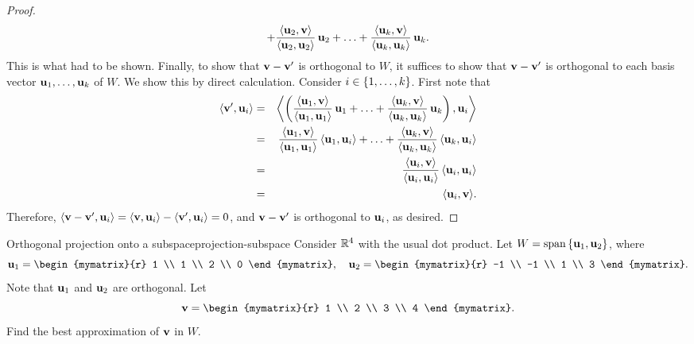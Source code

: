 \begin{proof}
\begin{equation*}
    + \frac{\iprod{\vect{u}_2,\vect{v}}}{\iprod{\vect{u}_2,\vect{u}_2}}\,\vect{u}_2
    + \ldots
    + \frac{\iprod{\vect{u}_k,\vect{v}}}{\iprod{\vect{u}_k,\vect{u}_k}}\,\vect{u}_k.
  \end{equation*}
  This is what had to be shown. Finally, to show that
  $\vect{v}-\vect{v}'$ is orthogonal to $W$, it suffices to show that
  $\vect{v}-\vect{v}'$ is orthogonal to each basis vector
  $\vect{u}_1,\ldots,\vect{u}_k$ of $W$. We show this by direct calculation.
  Consider $i\in\left\{1,\ldots,k\right\}$. First note that
  \begin{eqnarray*}
    \iprod{\vect{v}',\vect{u}_i}
    &=& \bigiprod{\paren{
        \frac{\iprod{\vect{u}_1,\vect{v}}}{\iprod{\vect{u}_1,\vect{u}_1}}\,\vect{u}_1
        + \ldots
        + \frac{\iprod{\vect{u}_k,\vect{v}}}{\iprod{\vect{u}_k,\vect{u}_k}}\,\vect{u}_k},
        \vect{u}_i} \\
    &=&
        \frac{\iprod{\vect{u}_1,\vect{v}}}{\iprod{\vect{u}_1,\vect{u}_1}}\,\iprod{\vect{u}_1,\vect{u}_i}
        + \ldots
        + \frac{\iprod{\vect{u}_k,\vect{v}}}{\iprod{\vect{u}_k,\vect{u}_k}}\,\iprod{\vect{u}_k,\vect{u}_i}
    \\
    &=& \frac{\iprod{\vect{u}_i,\vect{v}}}{\iprod{\vect{u}_i,\vect{u}_i}}\,\iprod{\vect{u}_i,\vect{u}_i} \\
    &=& \iprod{\vect{u}_i,\vect{v}}.
  \end{eqnarray*}
  Therefore,
  $\iprod{\vect{v}-\vect{v}',\vect{u}_i} = \iprod{\vect{v},\vect{u}_i}
  - \iprod{\vect{v}',\vect{u}_i} = 0$, and $\vect{v}-\vect{v}'$ is
  orthogonal to $\vect{u}_i$, as desired.
\end{proof}

\begin{example}{Orthogonal projection onto a subspace}{projection-subspace}
  Consider $\mathbb{R}^4$ with the usual dot product. Let
  $W=\sspan\set{\vect{u}_1,\vect{u}_2}$, where
  \begin{equation*}
    \vect{u}_1 = \begin{mymatrix}{r} 1 \\ 1 \\ 2 \\ 0 \end{mymatrix}, \quad
    \vect{u}_2 = \begin{mymatrix}{r} -1 \\ -1 \\ 1 \\ 3 \end{mymatrix}.
  \end{equation*}
  Note that $\vect{u}_1$ and $\vect{u}_2$ are orthogonal. Let
  \begin{equation*}
    \vect{v} = \begin{mymatrix}{r} 1 \\ 2 \\ 3 \\ 4 \end{mymatrix}.
  \end{equation*}
  Find the best approximation of $\vect{v}$ in $W$.
\end{example}

